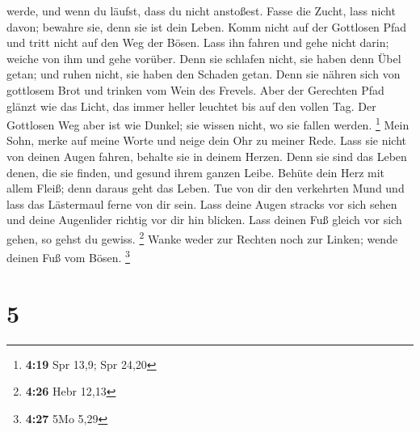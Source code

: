 werde, und wenn du läufst, dass du nicht anstoßest.  Fasse
die Zucht, lass nicht davon; bewahre sie, denn sie ist dein Leben.
 Komm nicht auf der Gottlosen Pfad und tritt nicht auf den
Weg der Bösen.  Lass ihn fahren und gehe nicht darin;
weiche von ihm und gehe vorüber.  Denn sie schlafen nicht,
sie haben denn Übel getan; und ruhen nicht, sie haben den Schaden getan.
 Denn sie nähren sich von gottlosem Brot und trinken vom
Wein des Frevels.  Aber der Gerechten Pfad glänzt wie das
Licht, das immer heller leuchtet bis auf den vollen Tag. 
Der Gottlosen Weg aber ist wie Dunkel; sie wissen nicht, wo sie fallen
werden. \footnote{\textbf{4:19} Spr 13,9; Spr 24,20}  Mein
Sohn, merke auf meine Worte und neige dein Ohr zu meiner Rede.
 Lass sie nicht von deinen Augen fahren, behalte sie in
deinem Herzen.  Denn sie sind das Leben denen, die sie
finden, und gesund ihrem ganzen Leibe.  Behüte dein Herz
mit allem Fleiß; denn daraus geht das Leben.  Tue von dir
den verkehrten Mund und lass das Lästermaul ferne von dir sein.
 Lass deine Augen stracks vor sich sehen und deine
Augenlider richtig vor dir hin blicken.  Lass deinen Fuß
gleich vor sich gehen, so gehst du gewiss. \footnote{\textbf{4:26} Hebr
  12,13}  Wanke weder zur Rechten noch zur Linken; wende
deinen Fuß vom Bösen. \footnote{\textbf{4:27} 5Mo 5,29}

\hypertarget{section-3}{%
\section{5}\label{section-3}}

